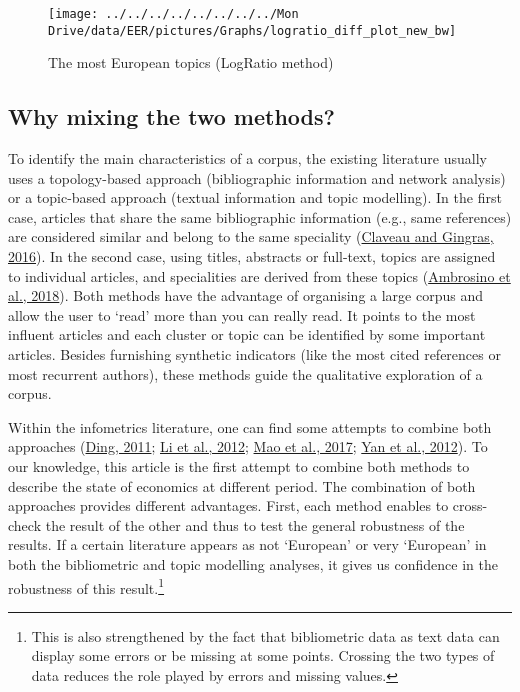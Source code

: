\documentclass[
]{article}
\begin{document}
\begin{figure}[h]

{\centering \texttt{[image: ../../../../../../../../Mon Drive/data/EER/pictures/Graphs/logratio\_diff\_plot\_new\_bw]} 

}

\caption{The most European topics (LogRatio method)}\label{fig:plot-topic-diff}
\end{figure}

\hypertarget{why-mixing-the-two-methods}{%
\subsection{Why mixing the two
methods?}\label{why-mixing-the-two-methods}}

To identify the main characteristics of a corpus, the existing
literature usually uses a topology-based approach (bibliographic
information and network analysis) or a topic-based approach (textual
information and topic modelling). In the first case, articles that share
the same bibliographic information (e.g., same references) are
considered similar and belong to the same speciality
(\protect\hyperlink{ref-claveau2016}{Claveau and Gingras, 2016}). In the
second case, using titles, abstracts or full-text, topics are assigned
to individual articles, and specialities are derived from these topics
(\protect\hyperlink{ref-ambrosino2018}{Ambrosino et al., 2018}). Both
methods have the advantage of organising a large corpus and allow the
user to `read' more than you can really read. It points to the most
influent articles and each cluster or topic can be identified by some
important articles. Besides furnishing synthetic indicators (like the
most cited references or most recurrent authors), these methods guide
the qualitative exploration of a corpus.

Within the infometrics literature, one can find some attempts to combine
both approaches (\protect\hyperlink{ref-dingCommunity2011}{Ding, 2011};
\protect\hyperlink{ref-liAdding2012}{Li et al., 2012};
\protect\hyperlink{ref-maoTopic2017}{Mao et al., 2017};
\protect\hyperlink{ref-yanTopics2012}{Yan et al., 2012}). To our
knowledge, this article is the first attempt to combine both methods to
describe the state of economics at different period. The combination of
both approaches provides different advantages. First, each method
enables to cross-check the result of the other and thus to test the
general robustness of the results. If a certain literature appears as
not `European' or very `European' in both the bibliometric and topic
modelling analyses, it gives us confidence in the robustness of this
result.\footnote{This is also strengthened by the fact that bibliometric
  data as text data can display some errors or be missing at some
  points. Crossing the two types of data reduces the role played by
  errors and missing values.}
\end{document}
